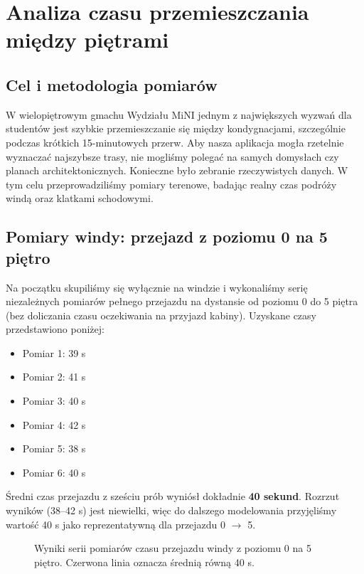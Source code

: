 \documentclass[14pt,a4paper]{extarticle}
\begin{document}
\section{Analiza czasu przemieszczania między piętrami}

\subsection{Cel i metodologia pomiarów}
W wielopiętrowym gmachu Wydziału MiNI jednym z największych wyzwań dla studentów jest szybkie przemieszczanie się między kondygnacjami, szczególnie podczas krótkich 15-minutowych przerw. Aby nasza aplikacja mogła rzetelnie wyznaczać najszybsze trasy, nie mogliśmy polegać na samych domysłach czy planach architektonicznych. Konieczne było zebranie rzeczywistych danych. W tym celu przeprowadziliśmy pomiary terenowe, badając realny czas podróży windą oraz klatkami schodowymi.

\subsection{Pomiary windy: przejazd z poziomu 0 na 5 piętro}
Na początku skupiliśmy się wyłącznie na windzie i wykonaliśmy serię niezależnych pomiarów pełnego przejazdu na dystansie od poziomu 0 do 5 piętra (bez doliczania czasu oczekiwania na przyjazd kabiny). Uzyskane czasy przedstawiono poniżej:
\begin{itemize}
    \item Pomiar 1: 39 s
    \item Pomiar 2: 41 s
    \item Pomiar 3: 40 s
    \item Pomiar 4: 42 s
    \item Pomiar 5: 38 s
    \item Pomiar 6: 40 s
\end{itemize}

Średni czas przejazdu z sześciu prób wyniósł dokładnie \textbf{40 sekund}. Rozrzut wyników (38--42 s) jest niewielki, więc do dalszego modelowania przyjęliśmy wartość 40 s jako reprezentatywną dla przejazdu 0 $\rightarrow$ 5.

\begin{figure}[H]
    \centering
    \caption{Wyniki serii pomiarów czasu przejazdu windy z poziomu 0 na 5 piętro. Czerwona linia oznacza średnią równą 40 s.}
    \label{fig:pomiary-windy-0-5}
\end{figure}
\end{document}
